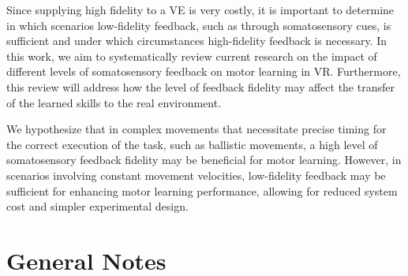 \documentclass[conference]{IEEEtran}
\begin{document}

Since supplying high fidelity to a VE is very costly, it is important to determine in which scenarios low-fidelity feedback, such as through somatosensory cues, is sufficient and under which circumstances high-fidelity feedback is necessary. In this work, we aim to systematically review current research on the impact of different levels of somatosensory feedback on motor learning in VR. Furthermore, this review will address how the level of feedback fidelity may affect the transfer of the learned skills to the real environment.

We hypothesize that in complex movements that necessitate precise timing for the correct execution of the task, such as ballistic movements, a high level of somatosensory feedback fidelity may be beneficial for motor learning. However, in scenarios involving constant movement velocities, low-fidelity feedback may be sufficient for enhancing motor learning performance, allowing for reduced system cost and simpler experimental design. \newpage

\section{General Notes}
\end{document}

